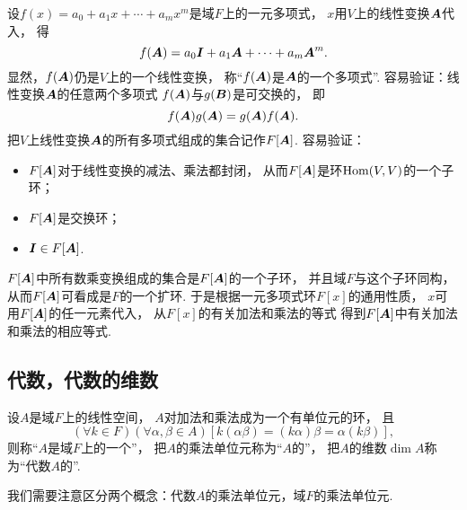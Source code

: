 设\(f(x)=a_0+a_1 x+\dotsb+a_m x^m\)是域\(F\)上的一元多项式，
\(x\)用\(V\)上的线性变换\(\boldsymbol{A}\)代入，
得\begin{equation*}
	f(\boldsymbol{A})=a_0\boldsymbol{I}+a_1\boldsymbol{A}+\dotsb+a_m\boldsymbol{A}^m.
\end{equation*}
显然，\(f(\boldsymbol{A})\)仍是\(V\)上的一个线性变换，
称“\(f(\boldsymbol{A})\)是\(\boldsymbol{A}\)的一个多项式”.
容易验证：线性变换\(\boldsymbol{A}\)的任意两个多项式
\(f(\boldsymbol{A})\)与\(g(\boldsymbol{B})\)是可交换的，
即\begin{equation*}
	f(\boldsymbol{A}) g(\boldsymbol{A})
	=g(\boldsymbol{A}) f(\boldsymbol{A}).
\end{equation*}
把\(V\)上线性变换\(\boldsymbol{A}\)的所有多项式组成的集合记作\(F[\boldsymbol{A}]\).
容易验证：
\begin{itemize}
	\item \(F[\boldsymbol{A}]\)对于线性变换的减法、乘法都封闭，
	从而\(F[\boldsymbol{A}]\)是环\(\operatorname{Hom}(V,V)\)的一个子环；

	\item \(F[\boldsymbol{A}]\)是交换环；

	\item \(\boldsymbol{I}\in F[\boldsymbol{A}]\).
\end{itemize}
\(F[\boldsymbol{A}]\)中所有数乘变换组成的集合是\(F[\boldsymbol{A}]\)的一个子环，
并且域\(F\)与这个子环同构，
从而\(F[\boldsymbol{A}]\)可看成是\(F\)的一个扩环.
于是根据一元多项式环\(F[x]\)的通用性质，
\(x\)可用\(F[\boldsymbol{A}]\)的任一元素代入，
从\(F[x]\)的有关加法和乘法的等式
得到\(F[\boldsymbol{A}]\)中有关加法和乘法的相应等式.

\subsection{代数，代数的维数}
\begin{definition}
设\(A\)是域\(F\)上的线性空间，
\(A\)对加法和乘法成为一个有单位元的环，
且\[
	(\forall k\in F)
	(\forall\alpha,\beta\in A)
	[
		k(\alpha\beta)
		=(k\alpha)\beta
		=\alpha(k\beta)
	],
\]
则称“\(A\)是域\(F\)上的一个”，
把\(A\)的乘法单位元称为“\(A\)的”，
把\(A\)的维数\(\dim A\)称为“代数\(A\)的”.
\end{definition}
\begin{remark}
我们需要注意区分两个概念：代数\(A\)的乘法单位元，域\(F\)的乘法单位元.
\end{remark}

